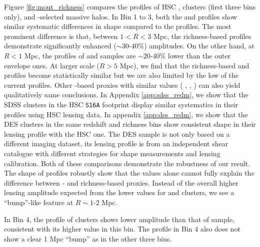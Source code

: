 \documentclass[fleqn,usenatbib,useAMS]{mnras}
\begin{document}
\begin{CJK*}{UTF8}{gbsn}
    Figure \ref{fig:mout_richness} compares the \dsigma{} profiles of HSC \redm{}, \camira{}
    clusters (first three bins only), and -selected massive halos.
    In Bin 1 to 3, both the \redm{} and \camira{} \dsigma{} profiles show similar systematic
    differences in shape compared to the  profiles.
    The most prominent difference is that, between $1 < R < 3$ Mpc, the richness-based \dsigma{}
    profiles demonstrate significantly enhanced ($\sim 30$-40\%) \dsigma{} amplitudes.
    On the other hand, at $R < 1$ Mpc, the \dsigma{} profiles of \redm{} and \camira{} samples
    are $\sim 20$-40\% lower than the outer envelope \mstar{} ones.
    At larger scale ($R > 5$ Mpc), we find that the richness-based and  \dsigma{}
    profiles become statistically similar but we are also limited by the low \snratio{} of the
    current profiles.
    Other \mstar{}-based proxies with similar \sigmvir{} values (\eg{} , \masap{},
    ) can also yield qualitatively same conclusions.
    In Appendix \ref{app:sdss_redm}, we show that the SDSS \redm{} clusters in the HSC
    \texttt{S16A} footprint display similar systematics in their \dsigma{} profiles using HSC
    lensing data. 
    In appendix \ref{app:des_redm}, we show that the DES \redm{} clusters in the same 
    redshift and richness bins show consistent shape in their lensing profile with the HSC one.
    The DES sample is not only based on a different imaging dataset, its lensing profile 
    is from an independent shear catalogue with different strategies for shape measurements and 
    lensing calibration.
    Both of these comparisons demonstrate the robustness of our result.
    The shape of \dsigma{} profiles robustly show that the \sigmvir{} values alone cannot fully
    explain the difference between \mstar{}- and richness-based \mvir{} proxies.
    Instead of the overall higher lensing amplitude expected from the lower \sigmvir{} values
    for \redm{} and \camira{} clusters, we see a ``bump''-like feature at $R \sim 1$-2 Mpc.

    In Bin 4, the \dsigma{} profile of \redm{} clusters shows lower amplitude than that of 
     sample, consistent with its higher \sigmvir{} value in this bin. 
    The \dsigma{} profile in Bin 4 also does not show a clear 1 Mpc ``bump'' as in the other three
    bins.
    

\end{CJK*}
\end{document}
